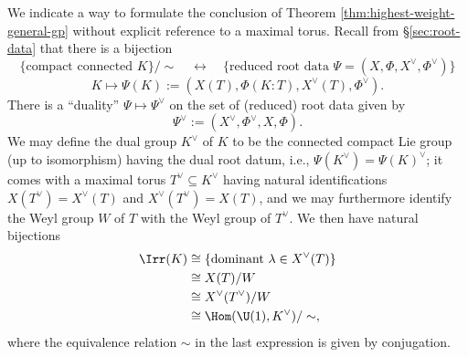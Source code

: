 \documentclass[reqno]{amsart} 
\begin{document}
\begin{remark}
  We indicate a way to formulate the conclusion of Theorem \ref{thm:highest-weight-general-gp} without explicit reference to a maximal torus.  Recall from \S\ref{sec:root-data} that there is a bijection
  \begin{equation*}
    \{\text{compact connected } K\}/\sim \quad \leftrightarrow \quad \{\text{reduced root data } \Psi = (X, \Phi, X^\vee, \Phi^\vee)\}
  \end{equation*}
  \begin{equation*}
    K \mapsto \Psi(K) := (X(T), \Phi(K:T), X^\vee(T), \Phi^\vee).
  \end{equation*}
  There is a ``duality'' $\Psi \mapsto \Psi^\vee$ on the set of (reduced) root data given by
  \begin{equation*}
    \Psi^\vee := (X^\vee, \Phi^\vee, X, \Phi).
  \end{equation*}
  We may define the dual group $K^\vee$ of $K$ to be the connected compact Lie group (up to isomorphism) having the dual root datum, i.e., $\Psi(K^\vee) = \Psi(K)^\vee$; it comes with a maximal torus $T^\vee \subseteq K^\vee$ having natural identifications $X(T^\vee) = X^\vee(T)$ and $X^\vee(T^\vee) = X(T)$, and we may furthermore identify the Weyl group $W$ of $T$ with the Weyl group of $T^\vee$.  We then have natural bijections
  \begin{align*}
    \Irr(K)
    &\cong
      \{\text{dominant } \lambda \in X^\vee(T)\}
    \\
    &\cong
      X(T) / W
    \\
    &\cong
      X^\vee(T^\vee) / W
    \\
    &\cong
      \Hom(\U(1), K^\vee)/\sim,
  \end{align*}
  where the equivalence relation $\sim$ in the last expression is given by conjugation.
\end{remark}
\end{document}
